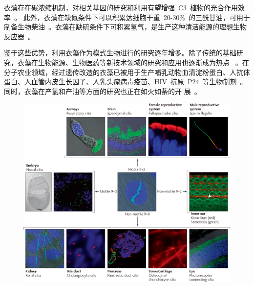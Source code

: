 \begin{asparaitem}[\DiamondSolid]
\item 衣藻存在碳浓缩机制，对相关基因的研究和利用有望增强\ C3\ 植物的光合作用效率\
    \citep{Wang2011,Wang2014b,Atkinson2015,Grossman2007}。 此外，衣藻在缺氮条件下可以积累达细胞干重\ 20-30\%\ 的三酰甘油，可用于制备生物柴油\ \citep{Ho2014}。衣藻在缺硫条件下可积累氢气，是生产这种清洁能源的理想生物反应器\ \citep{Ho2014}。

\end{asparaitem}

鉴于这些优势，利用衣藻作为模式生物进行的研究逐年增多。除了传统的基础研究，衣藻在生物能源、生物医药等新技术领域的研究和应用也逐渐成为热点\
\citep{Franklin2004,Fuhrmann2004,Leon-Banares2004,Mayfield2007,Gallaher2015,Kempinski2015,Wijffels2010,Lauersen2013} 。在分子农业领域，经过遗传改造的衣藻已被用于生产哺乳动物血清淀粉蛋白、人抗体蛋白、人血管内皮生长因子、人乳头瘤病毒疫苗、HIV\ 抗原\ P24\ 等生物制剂\ \citep{Barahimipour2016}。 同时，衣藻在产氢和产油等方面的研究也正在如火如荼的开
展\ \citep{Gallaher2015,Flowers2015,Kempinski2015,Greenly2015}。

\begin{figure}[htb!]
\centering
\graphicspath{{figures/}}
\includegraphics[width=\textwidth]{fig2-5.jpg}
{
\par}
\end{figure}

